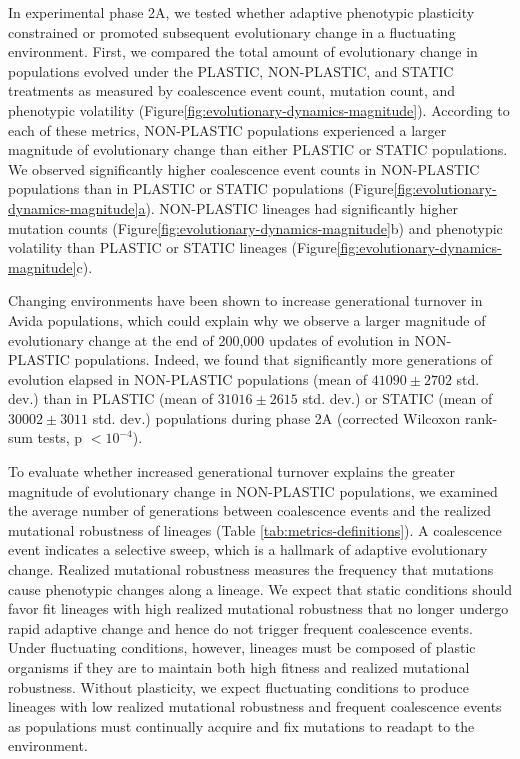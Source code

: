 \documentclass[utf8]{frontiersSCNS} %
\providecommand{\DIFaddtex}[1]{{\protect\color{blue}\uwave{#1}}} %
\providecommand{\DIFaddbegin}{} %
\providecommand{\DIFaddend}{} %
\providecommand{\DIFadd}[1]{\texorpdfstring{\DIFaddtex{#1}}{#1}} %
\newcommand{\DIFaddincludegraphics}[2][]{{\color{blue}\fbox{\DIFOincludegraphics[#1]{#2}}}} %
\DeclareRobustCommand{\DIFaddbegin}{\DIFOaddbegin \let\includegraphics\DIFaddincludegraphics} %
\DeclareRobustCommand{\DIFaddend}{\DIFOaddend \let\includegraphics\DIFOincludegraphics} %
\begin{document}
\begin{raggedbottom}
In experimental phase 2A,
we tested whether adaptive phenotypic plasticity constrained or promoted subsequent evolutionary change in a fluctuating environment.
First, we compared the total amount of evolutionary change in populations evolved under the PLASTIC, NON-PLASTIC, and STATIC treatments as measured by coalescence event count, mutation count, and phenotypic volatility (Figure\DIFaddbegin \DIFadd{~}\DIFaddend \ref{fig:evolutionary-dynamics-magnitude}).
According to each of these metrics, NON-PLASTIC populations experienced a larger magnitude of evolutionary change than either PLASTIC or STATIC populations.
We observed significantly higher coalescence event counts in NON-PLASTIC populations than in PLASTIC or STATIC populations (Figure\DIFaddbegin \DIFadd{~}\DIFaddend \ref{fig:evolutionary-dynamics-magnitude}\hyperref[fig:evolutionary-dynamics-magnitude]{a}).
NON-PLASTIC lineages had significantly higher mutation counts (Figure\DIFaddbegin \DIFadd{~}\DIFaddend \ref{fig:evolutionary-dynamics-magnitude}b) and phenotypic volatility than PLASTIC or STATIC lineages (Figure\DIFaddbegin \DIFadd{~}\DIFaddend \ref{fig:evolutionary-dynamics-magnitude}c).

Changing environments have been shown to increase generational turnover \DIFaddbegin \DIFadd{(}\textit{\DIFadd{i.e.}}\DIFadd{, how rapidly generations elapse) }\DIFaddend in Avida populations\DIFaddbegin \DIFadd{~}\DIFaddend \citep{canino-koning_evolution_2016}, which could explain why we observe a larger magnitude of evolutionary change at the end of 200,000 updates of evolution in NON-PLASTIC populations.
Indeed, we found that significantly more generations of evolution elapsed in NON-PLASTIC populations (mean of $41090\pm2702$ std. dev.) than in PLASTIC (mean of $31016\pm2615$ std. dev.) or STATIC (mean of $30002\pm3011$ std. dev.) populations during phase 2A (corrected Wilcoxon rank-sum tests, p $<10^{-4}$).

To evaluate whether increased generational turnover explains the greater magnitude of evolutionary change in NON-PLASTIC populations, we examined the average number of generations between coalescence events and the realized mutational robustness of lineages (Table \ref{tab:metrics-definitions}).
A coalescence event indicates a selective sweep, which is a hallmark of adaptive evolutionary change.
Realized mutational robustness measures the frequency that mutations cause phenotypic changes along a lineage.
We expect that static conditions should favor fit lineages with high realized mutational robustness that no longer undergo rapid adaptive change and hence do not trigger frequent coalescence events.
Under fluctuating conditions, however, lineages must be composed of plastic organisms if they are to maintain both high fitness and realized mutational robustness.
Without plasticity, we expect fluctuating conditions to produce lineages with low realized mutational robustness and frequent coalescence events as populations must continually acquire and fix mutations to readapt to the environment.


\end{raggedbottom}
\end{document}
